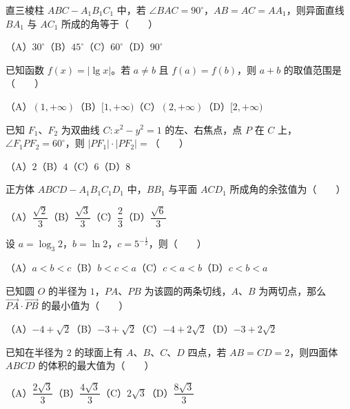 \begin{question}
直三棱柱 $ABC-A_1B_1C_1$ 中，若 $\angle BAC=90^\circ$，$AB=AC=AA_1$，则异面直线 $BA_1$ 与 $AC_1$ 所成的角等于\mbox{（　　）}

（A）$30^\circ$\quad（B）$45^\circ$\quad（C）$60^\circ$\quad（D）$90^\circ$

\end{question}
\begin{question}
已知函数 $f(x)=|\lg x|$。若 $a\neq b$ 且 $f(a)=f(b)$，则 $a+b$ 的取值范围是\mbox{（　　）}

（A）$(1,+\infty)$\quad（B）$[1,+\infty)$\quad（C）$(2,+\infty)$\quad（D）$[2,+\infty)$

\end{question}
\begin{question}
已知 $F_1\text{、}F_2$ 为双曲线 $C:x^2-y^2=1$ 的左、右焦点，点 $P$ 在 $C$ 上，$\angle F_1PF_2=60^\circ$，则 $|PF_1|\cdot|PF_2|=$\mbox{（　　）}

（A）$2$\quad（B）$4$\quad（C）$6$\quad（D）$8$

\end{question}
\begin{question}
正方体 $ABCD-A_1B_1C_1D_1$ 中，$BB_1$ 与平面 $ACD_1$ 所成角的余弦值为\mbox{（　　）}

（A）$\dfrac{\sqrt2}{3}$\quad（B）$\dfrac{\sqrt3}{3}$\quad（C）$\dfrac23$\quad（D）$\dfrac{\sqrt6}{3}$

\end{question}
\begin{question}
设 $a=\log_3 2$，$b=\ln2$，$c=5^{-\frac12}$，则\mbox{（　　）}

（A）$a<b<c$\quad（B）$b<c<a$\quad（C）$c<a<b$\quad（D）$c<b<a$

\end{question}
\begin{question}
已知圆 $O$ 的半径为 $1$，$PA\text{、}PB$ 为该圆的两条切线，$A\text{、}B$ 为两切点，那么 $\overrightarrow{PA}\cdot\overrightarrow{PB}$ 的最小值为\mbox{（　　）}

（A）$-4+\sqrt2$\quad（B）$-3+\sqrt2$\quad（C）$-4+2\sqrt2$\quad（D）$-3+2\sqrt2$

\end{question}
\begin{question}
已知在半径为 $2$ 的球面上有 $A\text{、}B\text{、}C\text{、}D$ 四点，若 $AB=CD=2$，则四面体 $ABCD$ 的体积的最大值为\mbox{（　　）}

（A）$\dfrac{2\sqrt3}{3}$\quad（B）$\dfrac{4\sqrt3}{3}$\quad（C）$2\sqrt3$\quad（D）$\dfrac{8\sqrt3}{3}$

\end{question}

